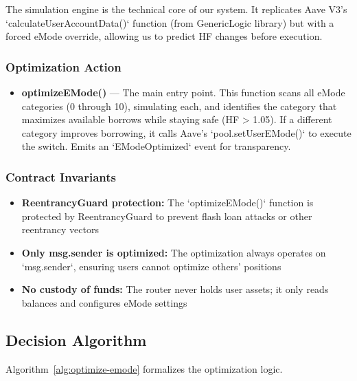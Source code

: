 The simulation engine is the technical core of our system. It replicates Aave V3's `calculateUserAccountData()` function (from GenericLogic library) but with a forced eMode override, allowing us to predict HF changes before execution.

\subsubsection{Optimization Action}

\begin{itemize}
    \item \textbf{optimizeEMode()} — The main entry point. This function scans all eMode categories (0 through 10), simulating each, and identifies the category that maximizes available borrows while staying safe (HF > 1.05). If a different category improves borrowing, it calls Aave's `pool.setUserEMode()` to execute the switch. Emits an `EModeOptimized` event for transparency.
\end{itemize}

\subsubsection{Contract Invariants}

\begin{itemize}
    \item \textbf{ReentrancyGuard protection:} The `optimizeEMode()` function is protected by ReentrancyGuard to prevent flash loan attacks or other reentrancy vectors
    \item \textbf{Only msg.sender is optimized:} The optimization always operates on `msg.sender`, ensuring users cannot optimize others' positions
    \item \textbf{No custody of funds:} The router never holds user assets; it only reads balances and configures eMode settings
\end{itemize}

\subsection{Decision Algorithm}\label{sec:decision-algorithm}

Algorithm~\ref{alg:optimize-emode} formalizes the optimization logic.

